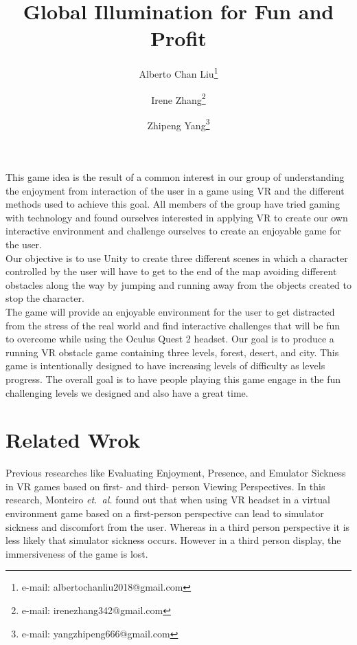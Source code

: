 \documentclass{vgtc}                          %
\title{Global Illumination for Fun and Profit}
\author{Alberto Chan Liu\thanks{e-mail: albertochanliu2018@gmail.com}\\ %
\and Irene Zhang\thanks{e-mail: irenezhang342@gmail.com}\\ %
\and Zhipeng Yang\thanks{e-mail: yangzhipeng666@gmail.com}\\ %
     }
\begin{document}


\maketitle
This game idea is the result of a common interest in our group of understanding the enjoyment from interaction of the user in a game using VR and the different methods used to achieve this goal. All members of the group have tried gaming with technology and found ourselves interested in applying VR to create our own interactive environment and challenge ourselves to create an enjoyable game for the user. 			
\\
Our objective is to use Unity to create three different scenes in which a character controlled by the user will have to get to the end of the map avoiding different obstacles along the way by jumping and running away from the objects created to stop the character. 
\\
The game will provide an enjoyable environment for the user to get distracted from the stress of the real world and find interactive challenges that will be fun to overcome while using the Oculus Quest 2 headset. Our goal is to produce a running VR obstacle game containing three levels, forest, desert, and city. This game is intentionally designed to have increasing levels of difficulty as levels progress. The overall goal is to have people playing this game engage in the fun challenging levels we designed and also have a great time.
 



\section{Related Wrok}
Previous researches like {E}valuating {E}njoyment, {P}resence, and {E}mulator {S}ickness in VR games based on first- and third- person {V}iewing {P}erspectives. In this research, Monteiro \emph{et.~al.}\cite{monteiro_liang_xu_brucker_nanjappan_yue_2018} found out that when using VR headset in a virtual environment game based on a first-person perspective can lead to simulator sickness and discomfort from the user. Whereas in a third person perspective it is less likely that simulator sickness occurs. However in a third person display, the immersiveness of the game is lost.
\end{document}
